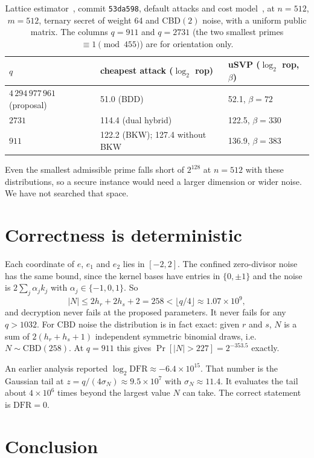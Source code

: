 \documentclass[11pt]{article}
\theoremstyle{remark}
\begin{document}
\begin{table}[h]\centering\small
\begin{tabular}{lll}\toprule
$q$ & cheapest attack ($\log_2$ rop) & uSVP ($\log_2$ rop, $\beta$)\\\midrule
$4\,294\,977\,961$ (proposal) & 51.0 (BDD) & 52.1, $\beta=72$\\
$2731$ & 114.4 (dual hybrid) & 122.5, $\beta=330$\\
$911$ & 122.2 (BKW); 127.4 without BKW & 136.9, $\beta=383$\\\bottomrule
\end{tabular}
\caption{Lattice estimator~\cite{estimator}, commit \texttt{53da598}, default attacks and cost model~\cite{MATZOV}, at $n=512$, $m=512$, ternary
secret of weight 64 and CBD$(2)$ noise, with a uniform public matrix. The columns $q=911$ and $q=2731$ (the two smallest
primes $\equiv1\pmod{455}$) are for orientation only.}\label{tab:est}
\end{table}

Even the smallest admissible prime falls short of $2^{128}$ at $n=512$ with these distributions, so a secure instance
would need a larger dimension or wider noise. We have not searched that space.

\section{Correctness is deterministic}

Each coordinate of $e$, $e_1$ and $e_2$ lies in $[-2,2]$. The confined zero-divisor noise has the same bound, since the
kernel bases have entries in $\{0,\pm1\}$ and the noise is $2\sum_j\alpha_jk_j$ with $\alpha_j\in\{-1,0,1\}$. So
\[
|N|\le 2h_r+2h_s+2=258<\lfloor q/4\rfloor\approx1.07\times10^{9},
\]
and decryption never fails at the proposed parameters. It never fails for any $q>1032$. For CBD noise the distribution
is in fact exact: given $r$ and $s$, $N$ is a sum of $2(h_r+h_s+1)$ independent symmetric binomial draws, i.e.\
$N\sim\mathrm{CBD}(258)$. At $q=911$ this gives $\Pr[|N|>227]=2^{-353.5}$ exactly.

An earlier analysis reported $\log_2\mathrm{DFR}\approx-6.4\times10^{15}$. That number is the Gaussian tail at
$z=q/(4\sigma_N)\approx9.5\times10^{7}$ with $\sigma_N\approx11.4$. It evaluates the tail about $4\times10^{6}$ times
beyond the largest value $N$ can take. The correct statement is $\mathrm{DFR}=0$.

\section{Conclusion}
\end{document}
